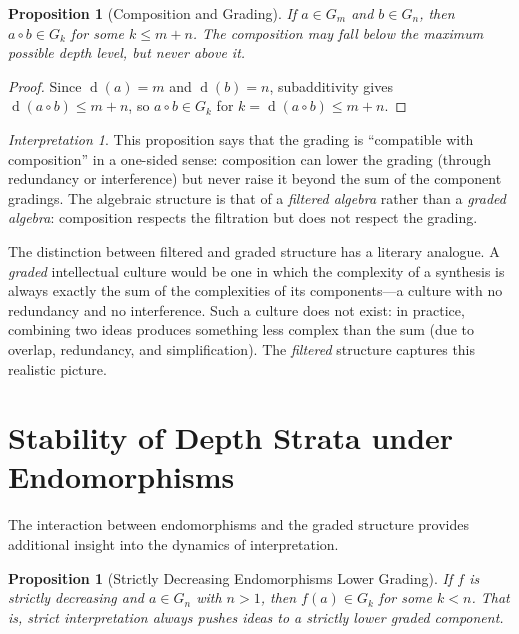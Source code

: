 \documentclass[11pt,openany]{book}
\theoremstyle{definition}
\theoremstyle{plain}
\newtheorem{proposition}[axiom]{Proposition}
\theoremstyle{remark}
\newtheorem{interpretation}[axiom]{Interpretation}
\newcommand{\compose}{\circ}                 %
\newcommand{\depth}{\operatorname{d}}       %
\begin{document}
\begin{proposition}[Composition and Grading]
If $a \in G_m$ and $b \in G_n$, then $a \compose b \in G_k$ for some $k \leq m + n$. The composition may fall below the maximum possible depth level, but never above it.
\end{proposition}

\begin{proof}
Since $\depth(a) = m$ and $\depth(b) = n$, subadditivity gives $\depth(a \compose b) \leq m + n$, so $a \compose b \in G_k$ for $k = \depth(a \compose b) \leq m + n$.
\end{proof}

\begin{interpretation}
This proposition says that the grading is ``compatible with composition'' in a one-sided sense: composition can lower the grading (through redundancy or interference) but never raise it beyond the sum of the component gradings. The algebraic structure is that of a \emph{filtered algebra} rather than a \emph{graded algebra}: composition respects the filtration but does not respect the grading.

The distinction between filtered and graded structure has a literary analogue. A \emph{graded} intellectual culture would be one in which the complexity of a synthesis is always exactly the sum of the complexities of its components---a culture with no redundancy and no interference. Such a culture does not exist: in practice, combining two ideas produces something less complex than the sum (due to overlap, redundancy, and simplification). The \emph{filtered} structure captures this realistic picture.
\end{interpretation}

\section{Stability of Depth Strata under Endomorphisms}

The interaction between endomorphisms and the graded structure provides additional insight into the dynamics of interpretation.

\begin{proposition}[Strictly Decreasing Endomorphisms Lower Grading]
If $f$ is strictly decreasing and $a \in G_n$ with $n > 1$, then $f(a) \in G_k$ for some $k < n$. That is, strict interpretation always pushes ideas to a \emph{strictly lower} graded component.
\end{proposition}
\end{document}
